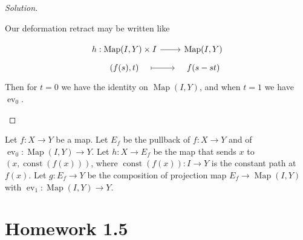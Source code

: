 \documentclass{article}
\numberwithin{equation}{section}
\DeclareMathOperator{\Map}{Map}
\DeclareMathOperator{\ev}{ev}
\begin{document}
\begin{proof}[Solution]
\begin{enumerate}[label*=\alph*.]
		Our deformation retract may be written like
		\iffalse\[\begin{tikzcd}[row sep=tiny]
			h:\Map(I,Y) \arrow[r]&\Map(I,\Map(I,Y))\\
			f(s)\arrow[r,maps to,shorten=2em]&t\mapsto f(s-st)
		\end{tikzcd}\]\fi
		\[\begin{tikzcd}[row sep=tiny]
			h:\Map(I,Y)\times I \arrow[r]&\Map(I,Y)\\
			(f(s),t)\arrow[r,maps to,shorten=1em]&f(s-st)
		\end{tikzcd}\]
		Then for $t=0$ we have the identity on $\Map(I,Y)$, and when $t=1$ we have $\ev_0$.
	\end{enumerate}
\end{proof}

Let $f : X \to Y$ be a map. Let $E_f$ be the pullback of $f : X \to Y$ and of $\ev_0 :\Map(I,Y)\to Y$. Let $h:X\to E_f$ be the map that sends $x$ to $(x,\operatorname{const}(f(x)))$, where $\operatorname{const}(f(x)) : I \to Y$ is the constant path at $f(x)$. Let $g : E_f \to Y$ be the composition of projection map $E_f \to \Map(I,Y)$ with $\ev_1 :\Map(I,Y)\to Y$.
\section{Homework 1.5}
\end{document}
